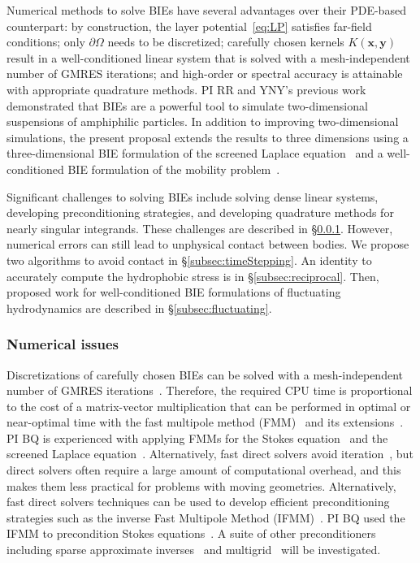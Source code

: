 Numerical methods to solve BIEs have several advantages over their
PDE-based counterpart: by construction, the layer
potential~\eqref{eq:LP} satisfies far-field conditions; only
$\partial\Omega$ needs to be discretized; carefully chosen kernels
$K(\mathbf{x},\mathbf{y})$ result in a well-conditioned linear system
that is solved with a mesh-independent number of GMRES iterations; and
high-order or spectral accuracy is attainable with appropriate
quadrature methods. PI RR and YNY's previous work~\cite{Fu2018_SIAM}
demonstrated that BIEs are a powerful tool to simulate two-dimensional
suspensions of amphiphilic particles. In addition to improving
two-dimensional simulations, the present proposal extends the results to three
dimensions using a three-dimensional BIE formulation of the
screened Laplace equation~\cite{ying_2006} and a well-conditioned BIE
formulation of the mobility problem~\cite{manasthesis, rac-gre2016}.

Significant challenges to solving BIEs include solving dense linear
systems, developing preconditioning strategies, and developing
quadrature methods for nearly singular integrands. These
challenges are described in \S\ref{subsec:NumericalIssues}. However,
numerical errors can still lead to unphysical contact between bodies. We
propose two algorithms to avoid contact in \S\ref{subsec:timeStepping}.
An identity to accurately compute the hydrophobic stress is in
\S\ref{subsec:reciprocal}. Then, proposed work for well-conditioned BIE
formulations of fluctuating hydrodynamics are described in
\S\ref{subsec:fluctuating}.



\subsubsection{Numerical issues}
\label{subsec:NumericalIssues}

Discretizations of carefully chosen BIEs can be solved with a
mesh-independent number of GMRES
iterations~\cite{cam-ips-kel-mey-xue1996}. Therefore, the required CPU
time is proportional to the cost of a matrix-vector multiplication that
can be performed in optimal or near-optimal time with the fast multipole
method (FMM)~\cite{fmm5} and its extensions~\cite{fmm1, fmm2, fmm3,
fmm4, fmm6, fmm7, fmm8}. PI BQ is experienced with applying FMMs for the
Stokes equation~\cite{qua-bir2014, bys-sha-qua2020} and the screened
Laplace equation~\cite{kro-qua2011, qua2011}.  Alternatively, fast
direct solvers avoid iteration~\cite{fds2, fds3, fds4, fds5, fds6, fds7,
ho2016cpam1, minden2016, minden2017siammms}, but direct solvers often
require a large amount of computational overhead, and this makes them
less practical for problems with moving geometries. Alternatively, fast
direct solvers techniques can be used to develop efficient
preconditioning strategies such as the inverse Fast Multipole Method
(IFMM)~\cite{cou-pou-dar2017}. PI BQ used the IFMM to precondition
Stokes equations~\cite{qua-cou-dar2018}. A suite of other
preconditioners including sparse approximate inverses~\cite{che2000} and
multigrid~\cite{hem-sch1981, sch1982} will be investigated.

